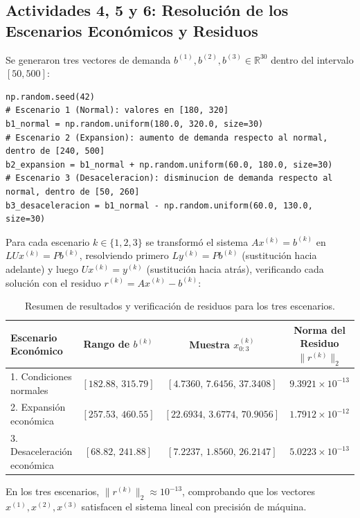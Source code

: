 \documentclass[11pt,a4paper]{article}
\begin{document}
\subsection{Actividades 4, 5 y 6: Resolución de los Escenarios Económicos y Residuos}
Se generaron tres vectores de demanda $b^{(1)}, b^{(2)}, b^{(3)} \in \mathbb{R}^{30}$ dentro del intervalo $[50, 500]$:
\begin{lstlisting}
np.random.seed(42)
# Escenario 1 (Normal): valores en [180, 320]
b1_normal = np.random.uniform(180.0, 320.0, size=30)
# Escenario 2 (Expansion): aumento de demanda respecto al normal, dentro de [240, 500]
b2_expansion = b1_normal + np.random.uniform(60.0, 180.0, size=30)
# Escenario 3 (Desaceleracion): disminucion de demanda respecto al normal, dentro de [50, 260]
b3_desaceleracion = b1_normal - np.random.uniform(60.0, 130.0, size=30)
\end{lstlisting}

Para cada escenario $k \in \{1, 2, 3\}$ se transformó el sistema $Ax^{(k)} = b^{(k)}$ en $LUx^{(k)} = Pb^{(k)}$, resolviendo primero $Ly^{(k)} = Pb^{(k)}$ (sustitución hacia adelante) y luego $Ux^{(k)} = y^{(k)}$ (sustitución hacia atrás), verificando cada solución con el residuo $r^{(k)} = Ax^{(k)} - b^{(k)}$:

\begin{table}[h!]
    \centering
    \small
    \caption{Resumen de resultados y verificación de residuos para los tres escenarios.}
    \begin{tabular}{lccc}
        \toprule
        \textbf{Escenario Económico} & \textbf{Rango de $b^{(k)}$} & \textbf{Muestra $x^{(k)}_{0:3}$} & \textbf{Norma del Residuo $\|r^{(k)}\|_2$} \\
        \midrule
        1. Condiciones normales & $[182.88, \, 315.79]$ & $[4.7360, \, 7.6456, \, 37.3408]$ & $9.3921 \times 10^{-13}$ \\
        2. Expansión económica & $[257.53, \, 460.55]$ & $[22.6934, \, 3.6774, \, 70.9056]$ & $1.7912 \times 10^{-12}$ \\
        3. Desaceleración económica & $[68.82, \, 241.88]$ & $[7.2237, \, 1.8560, \, 26.2147]$ & $5.0223 \times 10^{-13}$ \\
        \bottomrule
    \end{tabular}
\end{table}

En los tres escenarios, $\|r^{(k)}\|_2 \approx 10^{-13}$, comprobando que los vectores $x^{(1)}, x^{(2)}, x^{(3)}$ satisfacen el sistema lineal con precisión de máquina.
\end{document}
